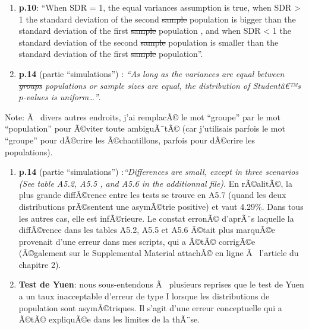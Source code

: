 \begin{appendix}
\begin{enumerate}
\def\labelenumi{\arabic{enumi})}
\setcounter{enumi}{1}
\item
  \color{black}\textbf{p.10}: ``When SDR = 1, the equal variances
  assumption is true, when SDR \textgreater{} 1 the standard deviation
  of the second \sout{sample} \color{blue} population \color{black} is
  bigger than the standard deviation of the first \sout{sample}
  \color{blue} population \color{black}, and when SDR \textless{} 1 the
  standard deviation of the second \sout{sample} \color{blue}population
  \color{black} is smaller than the standard deviation of the first
  \sout{sample} \color{blue} population''. \color{black}
\item
  \textbf{p.14} (partie ``simulations'') : \emph{``As long as the
  variances are equal between \sout{groups} \color{blue} populations
  \color{black} or sample sizes are equal, the distribution of
  Studentâ€™s \(p\)-values is uniform\ldots{}''}.
\end{enumerate}

Note: Ã~ divers autres endroits, j'ai remplacÃ© le mot ``groupe'' par le
mot ``population'' pour Ã©viter toute ambiguÃ¯tÃ© (car j'utilisais
parfois le mot ``groupe'' pour dÃ©crire les Ã©chantillons, parfois pour
dÃ©crire les populations).

\begin{enumerate}
\def\labelenumi{\arabic{enumi})}
\setcounter{enumi}{3}
\item
  \textbf{p.14} (partie ``simulations'') :\emph{``Differences are small,
  except in three scenarios (See table A5.2, A5.5 , and A5.6 in the
  additionnal file)}. En rÃ©alitÃ©, la plus grande diffÃ©rence entre les
  tests se trouve en A5.7 (quand les deux distributions prÃ©sentent une
  asymÃ©trie positive) et vaut 4.29\%. Dans tous les autres cas, elle
  est infÃ©rieure. Le constat erronÃ© d'aprÃ¨s laquelle la diffÃ©rence
  dans les tables A5.2, A5.5 et A5.6 Ã©tait plus marquÃ©e provenait
  d'une erreur dans mes scripts, qui a Ã©tÃ© corrigÃ©e (Ã©galement sur
  le Supplemental Material attachÃ© en ligne Ã~ l'article du chapitre
  2).
\item
  \textbf{Test de Yuen}: nous sous-entendons Ã~ plusieurs reprises que
  le test de Yuen a un taux inacceptable d'erreur de type I lorsque les
  distributions de population sont asymÃ©triques. Il s'agit d'une erreur
  conceptuelle qui a Ã©tÃ© expliquÃ©e dans les limites de la thÃ¨se.
\end{enumerate}


\end{appendix}
